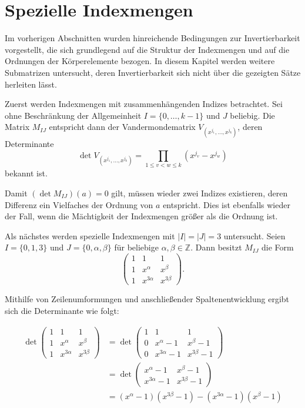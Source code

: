 \section{Spezielle Indexmengen}

Im vorherigen Abschnitten wurden hinreichende Bedingungen zur Invertierbarkeit vorgestellt, die sich grundlegend auf die Struktur der Indexmengen und auf die Ordnungen der Körperelemente bezogen. In diesem Kapitel werden weitere Submatrizen untersucht, deren Invertierbarkeit sich nicht über die gezeigten Sätze herleiten lässt.

Zuerst werden Indexmengen mit zusammenhängenden Indizes betrachtet. Sei ohne Beschränkung der Allgemeinheit $I = \{0,\dots,k-1\}$ und $J$ beliebig. Die Matrix $M_{IJ}$ entspricht dann der Vandermondematrix $V_{(x^{j_1},\dots,x^{j_k})}$, deren Determinante
\begin{equation*}
    \det V_{(x^{j_1},\dots,x^{j_k})} = \prod_{1\leq v<w\leq k} (x^{j_v} - x^{j_w})
\end{equation*}
bekannt ist. \cite{VandermondeDet} 

Damit $(\det M_{IJ})(a) = 0$ gilt, müssen wieder zwei Indizes existieren, deren Differenz ein Vielfaches der Ordnung von $a$ entspricht. Dies ist ebenfalls wieder der Fall, wenn die Mächtigkeit der Indexmengen größer als die Ordnung ist.

Als nächstes werden spezielle Indexmengen mit $|I| = |J| = 3$ untersucht. Seien $I = \{0, 1, 3\}$ und $J = \{0, \alpha, \beta\}$ für beliebige $\alpha,\beta \in \mathbb{Z}$. Dann besitzt $M_{IJ}$ die Form 
\begin{equation*}
    \begin{pmatrix}
        1 & 1 & 1 \\
        1 & x^{\alpha} & x^{\beta} \\
        1 & x^{3\alpha} & x^{3\beta}
    \end{pmatrix}.
\end{equation*}

Mithilfe von Zeilenumformungen und anschließender Spaltenentwicklung ergibt sich die Determinante wie folgt:

\begin{align*}
    \det \begin{pmatrix}
        1 & 1 & 1 \\
        1 & x^{\alpha} & x^{\beta} \\
        1 & x^{3\alpha} & x^{3\beta}
    \end{pmatrix}
    &= \det \begin{pmatrix}
        1 & 1 & 1 \\
        0 & x^{\alpha} -1 & x^{\beta} -1 \\
        0 & x^{3\alpha} -1 & x^{3\beta} -1
    \end{pmatrix} \\
    &= \det \begin{pmatrix}
        x^{\alpha} -1 & x^{\beta} -1 \\
        x^{3\alpha} -1 & x^{3\beta} -1
    \end{pmatrix} \\
    &= (x^{\alpha} -1)(x^{3\beta} -1) - (x^{3\alpha} -1)(x^{\beta} -1)
\end{align*}

